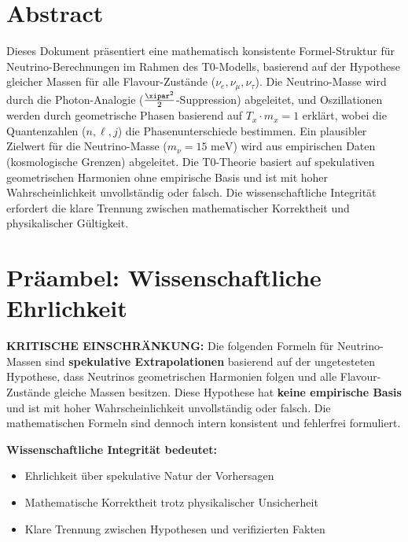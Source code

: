 \section*{Abstract}
		Dieses Dokument präsentiert eine mathematisch konsistente Formel-Struktur für Neutrino-Berechnungen im Rahmen des T0-Modells, basierend auf der Hypothese gleicher Massen für alle Flavour-Zustände (\(\nu_e, \nu_\mu, \nu_\tau\)). Die Neutrino-Masse wird durch die Photon-Analogie (\(\frac{\xipar^2}{2}\)-Suppression) abgeleitet, und Oszillationen werden durch geometrische Phasen basierend auf \( T_x \cdot m_x = 1 \) erklärt, wobei die Quantenzahlen (\(n, \ell, j\)) die Phasenunterschiede bestimmen. Ein plausibler Zielwert für die Neutrino-Masse (\(m_\nu = 15 \text{ meV}\)) wird aus empirischen Daten (kosmologische Grenzen) abgeleitet. Die T0-Theorie basiert auf spekulativen geometrischen Harmonien ohne empirische Basis und ist mit hoher Wahrscheinlichkeit unvollständig oder falsch. Die wissenschaftliche Integrität erfordert die klare Trennung zwischen mathematischer Korrektheit und physikalischer Gültigkeit.

	
	
	\section{Präambel: Wissenschaftliche Ehrlichkeit}
	
	\begin{warning}
		\textbf{KRITISCHE EINSCHRÄNKUNG:} Die folgenden Formeln für Neutrino-Massen sind \textbf{spekulative Extrapolationen} basierend auf der ungetesteten Hypothese, dass Neutrinos geometrischen Harmonien folgen und alle Flavour-Zustände gleiche Massen besitzen. Diese Hypothese hat \textbf{keine empirische Basis} und ist mit hoher Wahrscheinlichkeit unvollständig oder falsch. Die mathematischen Formeln sind dennoch intern konsistent und fehlerfrei formuliert.
		
		\vspace{0.5cm}
		\textbf{Wissenschaftliche Integrität bedeutet:}
		\begin{itemize}
			\item Ehrlichkeit über spekulative Natur der Vorhersagen
			\item Mathematische Korrektheit trotz physikalischer Unsicherheit
			\item Klare Trennung zwischen Hypothesen und verifizierten Fakten
		\end{itemize}
	\end{warning}
	
